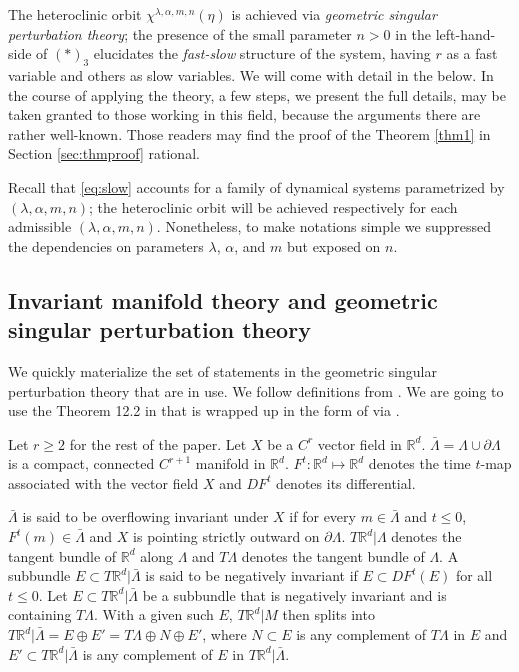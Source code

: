 \documentclass[a4paper,11pt]{article}
\theoremstyle{remark}
\begin{document}
The heteroclinic orbit $\chi^{\lambda,\alpha,m,n}(\eta)$ is achieved via {\it geometric singular perturbation theory}; the presence of the small parameter $n>0$ in the left-hand-side of $(*)_3$ elucidates the {\it fast-slow} structure of the system, having $r$ as a fast variable and others as slow variables. We will come with detail in the below. In the course of applying the theory, a few steps, we present the full details, may be taken granted to those working in this field, because the arguments there are rather well-known. Those readers may find the proof of the Theorem \ref{thm1} in Section \ref{sec:thmproof} rational. 

Recall that \eqref{eq:slow} accounts for a family of dynamical systems parametrized by $(\lambda,\alpha,m,n)$; the heteroclinic orbit will be achieved respectively for each admissible $(\lambda,\alpha,m,n)$. Nonetheless, to make notations simple we suppressed the dependencies on parameters $\lambda$, $\alpha$, and $m$ but exposed on $n$. %


\subsection{Invariant manifold theory and geometric singular perturbation theory}
We quickly materialize the set of statements in the geometric singular perturbation theory that are in use. We follow definitions from \cite{fenichel_asymptotic_1977,fenichel_geometric_1979}. %
We are going to use the Theorem 12.2 in \cite{fenichel_geometric_1979} that is wrapped up in the form of \cite[Theorem 2.2]{Sz1991} via \cite[Theorem 3]{fenichel_asymptotic_1977}.

Let $r\ge2$ for the rest of the paper. Let $X$ be a $C^{r}$ vector field in $\mathbb{R}^d$. $\bar{\Lambda}=\Lambda \cup \partial \Lambda$ is a compact, connected $C^{r+1}$ manifold in $\mathbb{R}^d$. $F^t: \mathbb{R}^d \mapsto \mathbb{R}^d$ denotes the time $t$-map associated with the vector field $X$ and $DF^t$ denotes its differential. 

$\bar{\Lambda}$ is said to be overflowing invariant under $X$ if for every $m\in\bar{\Lambda}$ and $t\le0$, $F^t(m)\in \bar{\Lambda}$ and $X$ is pointing strictly outward on $\partial \Lambda$. $T \mathbb{R}^d|\Lambda$ denotes the tangent bundle of $\mathbb{R}^d$ along $\Lambda$ and $T\Lambda$ denotes the tangent bundle of $\Lambda$. A subbundle $E\subset T\mathbb{R}^d|\bar{\Lambda}$ is said to be negatively invariant if $E\subset DF^t(E)$ for all $t\le0$. Let $E\subset T\mathbb{R}^d|\bar{\Lambda}$ be a subbundle that is negatively invariant and is containing $T\Lambda$. With a given such $E$,  $T \mathbb{R}^d|M$ then splits into $T\mathbb{R}^d|\bar{\Lambda} =E\oplus E'= T\Lambda\oplus N\oplus E'$, where $N\subset E$ is any complement of $T\Lambda$ in $E$ and $E'\subset T\mathbb{R}^d|\bar{\Lambda}$ is any complement of $E$ in $T\mathbb{R}^d|\bar{\Lambda}$.  
\end{document}
